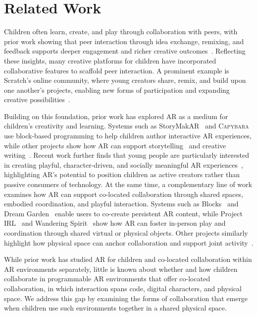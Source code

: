 \documentclass[sigconf,nonacm]{acmart}
\newcommand{\capybara}{\textsc{Capybara}\xspace}
\begin{document}
\section{Related Work}
Children often learn, create, and play through collaboration with peers, with prior work showing that peer interaction through idea exchange, remixing, and feedback supports deeper engagement and richer creative outcomes~\cite{Bruckman98, Brennan10, Resnick17}. 
Reflecting these insights, many creative platforms for children have incorporated collaborative features to scaffold peer interaction. A prominent example is Scratch’s online community, where young creators share, remix, and build upon one another’s projects, enabling new forms of participation and expanding creative possibilities~\cite{Hernandez07}.

Building on this foundation, prior work has explored AR as a medium for children’s creativity and learning. Systems such as StoryMakAR~\cite{Terrell20} and \capybara~\cite{Lei25} use block-based programming to help children author interactive AR experiences, while other projects show how AR can support storytelling~\cite{Zhang24, Alves25} and creative writing~\cite{Chung25}. Recent work further finds that young people are particularly interested in creating playful, character-driven, and socially meaningful AR experiences~\cite{Liaqat25}, highlighting AR’s potential to position children as active creators rather than passive consumers of technology. At the same time, a complementary line of work examines how AR can support co-located collaboration through shared spaces, embodied coordination, and playful interaction. Systems such as Blocks~\cite{Guo21} and Dream Garden~\cite{Petrov23} enable users to co-create persistent AR content, while Project IRL~\cite{Dagan22} and Wandering Spirit~\cite{Wang25} show how AR can foster in-person play and coordination through shared virtual or physical objects. Other projects similarly highlight how physical space can anchor collaboration and support joint activity~\cite{Poretski21, Numan25}.

While prior work has studied AR for children and co-located collaboration within AR environments separately, little is known about whether and how children collaborate in programmable AR environments that offer co-located collaboration, in which interaction spans code, digital characters, and physical space. We address this gap by examining the forms of collaboration that emerge when children use such environments together in a shared physical space.
\end{document}
